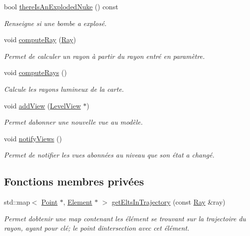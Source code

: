 \begin{DoxyCompactItemize}
bool \hyperlink{classLevel_ab52b9848381f3426728cfae132ae3120}{there\+Is\+An\+Exploded\+Nuke} () const 
\begin{DoxyCompactList}\small\item\em Renseigne si une bombe a explosé. \end{DoxyCompactList}\item 
void \hyperlink{classLevel_a9a04d35fd8f72d786707596c2e0efa66}{compute\+Ray} (\hyperlink{classRay}{Ray})
\begin{DoxyCompactList}\small\item\em Permet de calculer un rayon à partir du rayon entré en paramètre. \end{DoxyCompactList}\item 
void \hyperlink{classLevel_ad28d918ed43c60e845b8805cf9b6b139}{compute\+Rays} ()
\begin{DoxyCompactList}\small\item\em Calcule les rayons lumineux de la carte. \end{DoxyCompactList}\item 
void \hyperlink{classLevel_ae257142a2bb23b42a747ed7e6df520a4}{add\+View} (\hyperlink{classLevelView}{Level\+View} $\ast$)
\begin{DoxyCompactList}\small\item\em Permet d\textquotesingle{}abonner une nouvelle vue au modèle. \end{DoxyCompactList}\item 
void \hyperlink{classLevel_a9a4438ddbb8132978c4973618b366048}{notify\+Views} ()
\begin{DoxyCompactList}\small\item\em Permet de notifier les vues abonnées au niveau que son état a changé. \end{DoxyCompactList}\end{DoxyCompactItemize}
\subsection*{Fonctions membres privées}
\begin{DoxyCompactItemize}
\item 
std\+::map$<$ \hyperlink{classPoint}{Point} $\ast$, \hyperlink{classElement}{Element} $\ast$ $>$ \hyperlink{classLevel_a04fdb57c83687ebb4f89c5c5e925e712}{get\+Elts\+In\+Trajectory} (const \hyperlink{classRay}{Ray} \&ray)
\begin{DoxyCompactList}\small\item\em Permet d\textquotesingle{}obtenir une map contenant les élément se trouvant sur la trajectoire du rayon, ayant pour clé; le point d\textquotesingle{}intersection avec cet élément. \end{DoxyCompactList}\end{DoxyCompactItemize}
